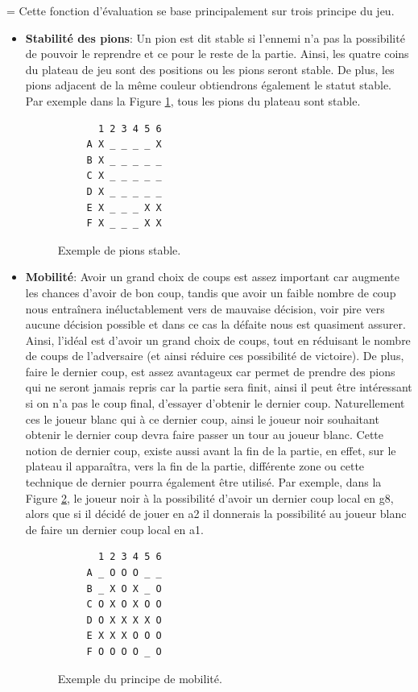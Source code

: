 \documentclass[10pt,a4paper]{article}
\begin{document}
=  Cette fonction d'évaluation se base principalement sur trois principe du jeu.
  \begin{itemize}
  \item \textbf{Stabilité des pions}: Un pion est dit stable si l'ennemi n'a pas la possibilité de pouvoir le reprendre et ce pour le reste de la partie. Ainsi, les quatre coins du plateau de jeu sont des positions ou les pions seront stable. De plus, les pions adjacent de la même couleur obtiendrons également le statut stable. Par exemple dans la Figure \ref{fig:pion_stable}, tous les pions du plateau sont stable.
   \begin{figure}[H]    
    \centering
    \begin{BVerbatim}
       1 2 3 4 5 6
     A X _ _ _ _ X
     B X _ _ _ _ _
     C X _ _ _ _ _
     D X _ _ _ _ _
     E X _ _ _ X X
     F X _ _ _ X X 
    \end{BVerbatim}
    \caption {Exemple de pions stable.\label{fig:pion_stable}}
   \end{figure}

\item \textbf{Mobilité}: Avoir un grand choix de coups est assez important car augmente les chances d'avoir de bon coup, tandis que avoir un faible nombre de coup nous entraînera inéluctablement vers de mauvaise décision, voir pire vers aucune décision possible et dans ce cas la défaite nous est quasiment assurer. Ainsi, l'idéal est d'avoir un grand choix de coups, tout en réduisant le nombre de coups de l'adversaire (et ainsi réduire ces possibilité de victoire).
  \newline
  De plus, faire le dernier coup, est assez avantageux car permet de prendre des pions qui ne seront jamais repris car la partie sera finit, ainsi il peut être intéressant si on n'a pas le coup final, d'essayer d'obtenir le dernier coup. Naturellement ces le joueur blanc qui  à ce dernier coup, ainsi le joueur noir souhaitant obtenir le dernier coup devra faire passer un tour au joueur blanc.
  Cette notion de dernier coup, existe aussi avant la fin de la partie, en effet, sur le plateau il apparaîtra, vers la fin de la partie, différente zone ou cette technique de dernier pourra également être utilisé.
  Par exemple, dans la Figure \ref{fig:mobilité}, le joueur noir à la possibilité d'avoir un dernier coup local en g8, alors que si il décidé de jouer en a2 il donnerais la possibilité au joueur blanc de faire un dernier coup local en a1.
  \begin{figure}[H]    
    \centering
    \begin{BVerbatim}
       1 2 3 4 5 6 
     A _ O O O _ _
     B _ X O X _ O
     C O X O X O O
     D O X X X X O
     E X X X O O O
     F O O O O _ O 
    \end{BVerbatim}
    \caption {Exemple du principe de mobilité.\label{fig:mobilité}}
  \end{figure}
    \end{itemize}
\end{document}
